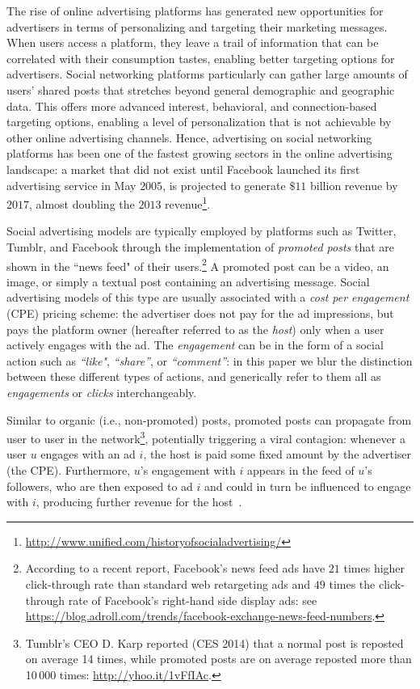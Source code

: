 
The rise of online advertising platforms has generated new opportunities for advertisers in terms of personalizing and targeting their marketing messages. When users access a platform, they leave a trail of information that can be correlated with their consumption tastes, enabling better targeting options for advertisers. Social networking platforms particularly can gather large amounts of users' shared posts that stretches beyond general demographic and geographic data. This offers more advanced interest, behavioral, and connection-based targeting options, enabling a level of personalization that is not achievable by other online advertising channels. Hence, advertising on social networking platforms has been one of the fastest growing sectors in the online advertising landscape: a market that did not exist until Facebook launched its first advertising service in May $2005$, is projected to generate $\$11$ billion revenue by $2017$, almost doubling the $2013$ revenue\footnote{\scriptsize \url{http://www.unified.com/historyofsocialadvertising/}}.

 Social advertising models are typically employed by platforms such as Twitter, Tumblr, and Facebook through the implementation of \emph{promoted posts} that are shown in the ``news feed" of their users.\footnote{\scriptsize According to a recent report, Facebook's news feed ads have $21$ times higher click-through rate than standard web retargeting ads and  $49$ times the click-through rate of Facebook's right-hand side display ads: see \url{https://blog.adroll.com/trends/facebook-exchange-news-feed-numbers}.} A promoted post can be a video, an image, or simply a textual post containing an advertising message.
Social advertising models of this type are usually associated with a \emph{cost per engagement} (CPE) pricing scheme: the advertiser does not pay for the ad impressions, but pays the platform owner (hereafter referred to as the \emph{host}) only when a user actively engages with the ad. The \emph{engagement} can be in the form of a social action such as \emph{``like"}, \emph{``share''}, or \emph{``comment''}: in this paper we blur the distinction between these different types of actions, and generically refer to them all as  \emph{engagements} or \emph{clicks} interchangeably.

Similar to organic (i.e., non-promoted) posts, promoted posts can propagate from user to user in the network\footnote{\scriptsize Tumblr's CEO D. Karp reported (CES 2014) that a normal post is reposted on average 14 times, while promoted posts are on average reposted more than 10\,000 times: \url{http://yhoo.it/1vFfIAc}.}, potentially triggering a viral contagion: whenever a user $u$ engages with an ad $i$, the host is paid some fixed amount by the advertiser (the CPE). Furthermore, $u$'s engagement with $i$ appears in the feed of $u$'s followers, who are then exposed to ad $i$ and could in turn be influenced to engage with $i$, producing further revenue for the host~\cite{bakshy12,tucker12}.

